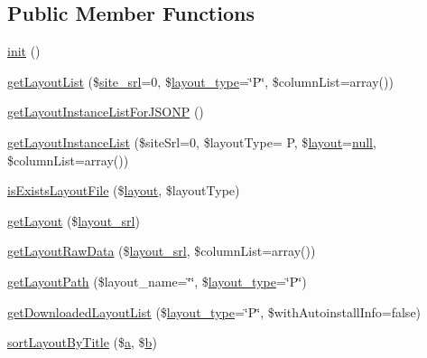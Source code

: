 \subsection*{Public Member Functions}
\begin{DoxyCompactItemize}
\item 
\hyperlink{classlayoutModel_a0e38b226e6c6f4ceae728725e40178fd}{init} ()
\item 
\hyperlink{classlayoutModel_afc353a7801c6cd15af3822e6fdac9ba2}{get\+Layout\+List} (\$\hyperlink{ko_8install_8php_a8b1406b4ad1048041558dce6bfe89004}{site\+\_\+srl}=0, \$\hyperlink{ko_8install_8php_a0532d89570cfdaebc628afac2ff5a81b}{layout\+\_\+type}=\char`\"{}P\char`\"{}, \$column\+List=array())
\item 
\hyperlink{classlayoutModel_a8093366d9ab2988d5ae6d51856752f91}{get\+Layout\+Instance\+List\+For\+J\+S\+O\+NP} ()
\item 
\hyperlink{classlayoutModel_a4cd0c42496b7529d53835669eb4798c5}{get\+Layout\+Instance\+List} (\$site\+Srl=0, \$layout\+Type= \textquotesingle{}P\textquotesingle{}, \$\hyperlink{classlayout}{layout}=\hyperlink{modernizr_8min_8js_a286f9ec831c5e676eeb493248eab9575}{null}, \$column\+List=array())
\item 
\hyperlink{classlayoutModel_aad01da0a48d593382de1d46df2c6d2c2}{is\+Exists\+Layout\+File} (\$\hyperlink{classlayout}{layout}, \$layout\+Type)
\item 
\hyperlink{classlayoutModel_a46f845328e6b65e772408ceb990adb6b}{get\+Layout} (\$\hyperlink{ko_8install_8php_a70054876db09b2519a1726663c8dd9e7}{layout\+\_\+srl})
\item 
\hyperlink{classlayoutModel_a008cf11689e020eb48ac719eb33979a6}{get\+Layout\+Raw\+Data} (\$\hyperlink{ko_8install_8php_a70054876db09b2519a1726663c8dd9e7}{layout\+\_\+srl}, \$column\+List=array())
\item 
\hyperlink{classlayoutModel_a78119afb7cf8bf74aee4f1a093f74dc5}{get\+Layout\+Path} (\$layout\+\_\+name=\char`\"{}\char`\"{}, \$\hyperlink{ko_8install_8php_a0532d89570cfdaebc628afac2ff5a81b}{layout\+\_\+type}=\char`\"{}P\char`\"{})
\item 
\hyperlink{classlayoutModel_aed10488985735bd1adda014388b3a781}{get\+Downloaded\+Layout\+List} (\$\hyperlink{ko_8install_8php_a0532d89570cfdaebc628afac2ff5a81b}{layout\+\_\+type}=\char`\"{}P\char`\"{}, \$with\+Autoinstall\+Info=false)
\item 
\hyperlink{classlayoutModel_a2fe5cbdc4be434f56cc1fed03588d1f4}{sort\+Layout\+By\+Title} (\$\hyperlink{jqplot_8barRenderer_8min_8js_a15f14caa0c9de3a415d8eb9d88378fc0}{a}, \$\hyperlink{jqplot_8barRenderer_8min_8js_a2fc619a5cd76c0e5c2bd9f57a6fcbd3e}{b})

\end{DoxyCompactItemize}
